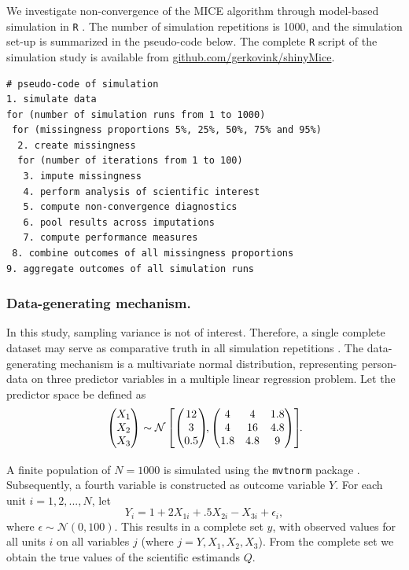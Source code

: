 \documentclass[Royal,times,sageh]{sagej}
\begin{document}
We investigate non-convergence of the MICE algorithm through model-based simulation in \texttt{R} \citep[version 3.6.3;][]{R}. The number of simulation repetitions is 1000, and the simulation set-up is summarized in the pseudo-code below. The complete \texttt{R} script of the simulation study is available from \href{https://github.com/gerkovink/shinyMice/tree/master/3.Thesis/}{github.com/gerkovink/shinyMice}.

\begin{verbatim}
# pseudo-code of simulation 
1. simulate data 
for (number of simulation runs from 1 to 1000)
 for (missingness proportions 5%, 25%, 50%, 75% and 95%)
  2. create missingness
  for (number of iterations from 1 to 100)
   3. impute missingness
   4. perform analysis of scientific interest
   5. compute non-convergence diagnostics 
   6. pool results across imputations
   7. compute performance measures
 8. combine outcomes of all missingness proportions
9. aggregate outcomes of all simulation runs 
\end{verbatim}

\hypertarget{data-generating-mechanism.}{%
\subsubsection{Data-generating mechanism.}\label{data-generating-mechanism.}}

In this study, sampling variance is not of interest. Therefore, a single complete dataset may serve as comparative truth in all simulation repetitions \citep{vink14}. The data-generating mechanism is a multivariate normal distribution, representing person-data on three predictor variables in a multiple linear regression problem. Let the predictor space be defined as
\[
\begin{aligned}
\begin{pmatrix}X_1\\
X_2\\
X_3
\end{pmatrix} \sim \mathcal{N}
\begin{bmatrix}
\begin{pmatrix}
12\\
3\\
0.5
\end{pmatrix}\!\!,
\begin{pmatrix}
4 & 4 & 1.8 \\
4 & 16 & 4.8\\
1.8 & 4.8 & 9
\end{pmatrix}
\end{bmatrix}\!\!\text{.}\\[2\jot]
\end{aligned}
\]
A finite population of \(N=1000\) is simulated using the \texttt{mvtnorm} package \citep{mvtnorm}. Subsequently, a fourth variable is constructed as outcome variable \(Y\). For each unit \(i = 1, 2,..., N\), let
\[
Y_i = 1 + 2X_{1i} +.5X_{2i} - X_{3i} + \epsilon_i ,
\]
where \(\epsilon \sim \mathcal{N}(0, 100)\). This results in a complete set \(y\), with observed values for all units \(i\) on all variables \(j\) (where \(j = Y, X_1, X_2, X_3\)). From the complete set we obtain the true values of the scientific estimands \(Q\).
\end{document}
